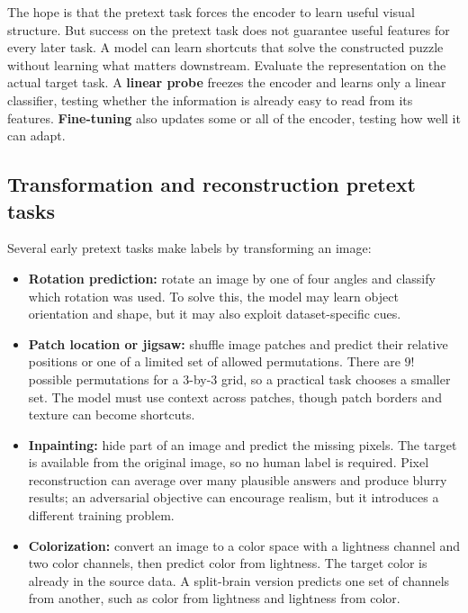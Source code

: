 The hope is that the pretext task forces the encoder to learn useful visual structure. But success on the pretext task does not guarantee useful features for every later task. A model can learn shortcuts that solve the constructed puzzle without learning what matters downstream. Evaluate the representation on the actual target task. A \textbf{linear probe} freezes the encoder and learns only a linear classifier, testing whether the information is already easy to read from its features. \textbf{Fine-tuning} also updates some or all of the encoder, testing how well it can adapt.

\subsection{Transformation and reconstruction pretext tasks}\label{04-visual-computing-ii-ch031-transformation-and-reconstruction-pretext-tasks}

\hypertarget{04-visual-computing-ii-ch031-transformation-and-reconstruction-pretext-tasks}{}

Several early pretext tasks make labels by transforming an image:

\begin{itemize}
\tightlist
\item
  \textbf{Rotation prediction:} rotate an image by one of four angles and classify which rotation was used. To solve this, the model may learn object orientation and shape, but it may also exploit dataset-specific cues.
\item
  \textbf{Patch location or jigsaw:} shuffle image patches and predict their relative positions or one of a limited set of allowed permutations. There are \(9!\) possible permutations for a 3-by-3 grid, so a practical task chooses a smaller set. The model must use context across patches, though patch borders and texture can become shortcuts.
\item
  \textbf{Inpainting:} hide part of an image and predict the missing pixels. The target is available from the original image, so no human label is required. Pixel reconstruction can average over many plausible answers and produce blurry results; an adversarial objective can encourage realism, but it introduces a different training problem.
\item
  \textbf{Colorization:} convert an image to a color space with a lightness channel and two color channels, then predict color from lightness. The target color is already in the source data. A split-brain version predicts one set of channels from another, such as color from lightness and lightness from color.
\end{itemize}

